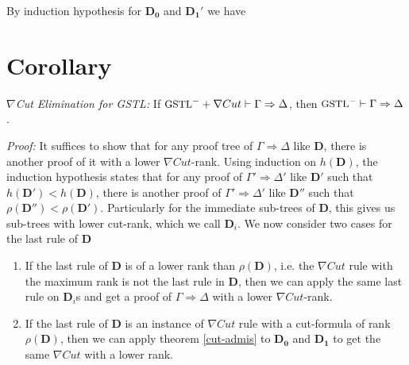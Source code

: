 \documentclass[a4paper, 12pt]{paper}
\begin{document}
\begin{enumerate}
\begin{enumerate}[label={\alph*.}]
\begin{prooftree}
			\dashedLine{}
		\end{prooftree}
		By induction hypothesis for $\mathbf{D_0}$ and $\mathbf{D_1}'$ we have
		\begin{prooftree}
			\noLine
			
			\noLine
			
		\end{prooftree}
	\end{enumerate}
\end{enumerate}

\section{Corollary} \emph{$\nabla$Cut Elimination for GSTL: }
If $\small\text{GSTL}^- + \nabla Cut \vdash \Gamma \Rightarrow \Delta$, then $\small\text{GSTL}^- \vdash \Gamma \Rightarrow \Delta$.

\emph{Proof:} It suffices to show that for any proof tree of $\Gamma \Rightarrow \Delta$ like $\mathbf{D}$, there is another proof of it with a lower $\nabla Cut$-rank. Using induction on $h(\mathbf{D})$, the induction hypothesis states that for any proof of $\Gamma' \Rightarrow \Delta'$ like $\mathbf{D'}$ such that $h(\mathbf{D'}) < h(\mathbf{D})$, there is another proof of $\Gamma' \Rightarrow \Delta'$ like $\mathbf{D''}$ such that $\rho(\mathbf{D''}) < \rho(\mathbf{D'})$. Particularly for the immediate sub-trees of $\mathbf{D}$, this gives us sub-trees with lower cut-rank, which we call $\mathbf{D}_i$. We now consider two cases for the last rule of $\mathbf{D}$

\begin{enumerate}[label=\Roman*]
	\item If the last rule of $\mathbf{D}$ is of a lower rank than $\rho(\mathbf{D})$, i.e. the $\nabla Cut$ rule with the maximum rank is not the last rule in $\mathbf{D}$, then we can apply the same last rule on $\mathbf{D}_i$s and get a proof of $\Gamma \Rightarrow \Delta$ with a lower $\nabla Cut$-rank.
	
	\item If the last rule of $\mathbf{D}$ is an instance of $\nabla Cut$ rule with a cut-formula of rank $\rho(\mathbf{D})$, then we can apply theorem \ref{cut-admis} to $\mathbf{D_0}$ and $\mathbf{D_1}$ to get the same $\nabla Cut$ with a lower rank.
\end{enumerate}
\end{document}
